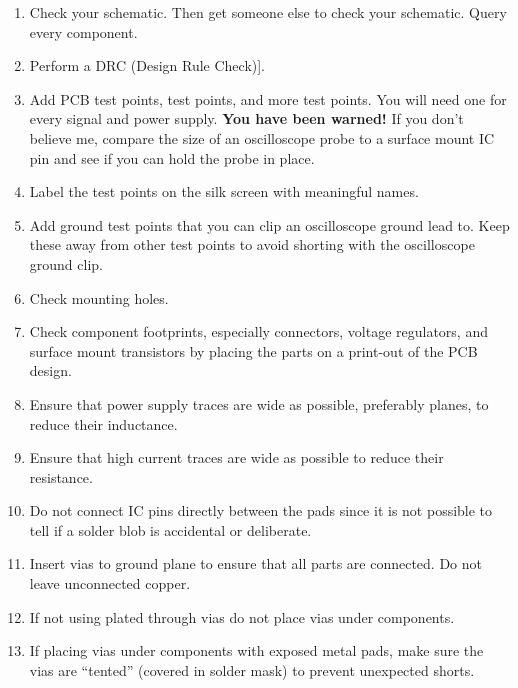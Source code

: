 \begin{enumerate}
\item Check your schematic.  Then get someone else to check your
  schematic.  Query every component.

\item Perform a DRC (Design Rule Check)].
  
\item Add PCB test points, test points, and more test points.  You
  will need one for every signal and power supply.  \textbf{You have
    been warned!}  If you don't believe me, compare the size of an
  oscilloscope probe to a surface mount IC pin and see if you can hold
  the probe in place.
  
\item Label the test points on the silk screen with meaningful names.
  
\item Add ground test points that you can clip an oscilloscope ground
  lead to.  Keep these away from other test points to avoid shorting
  with the oscilloscope ground clip.
  
\item Check mounting holes.
  
\item Check component footprints, especially connectors, voltage
  regulators, and surface mount transistors by placing the parts on a
  print-out of the PCB design.
  
\item Ensure that power supply traces are wide as possible, preferably
  planes, to reduce their inductance.
  
\item Ensure that high current traces are wide as possible to reduce their resistance.
  
\item Do not connect IC pins directly between the pads since it is not
  possible to tell if a solder blob is accidental or deliberate.

\item Insert vias to ground plane to ensure that all parts are connected.  Do not leave unconnected copper.
  
\item If not using plated through vias do not place vias under
  components.
  
\item If placing vias under components with exposed metal pads, make
  sure the vias are ``tented'' (covered in solder mask) to prevent
  unexpected shorts.
  

\end{enumerate}
